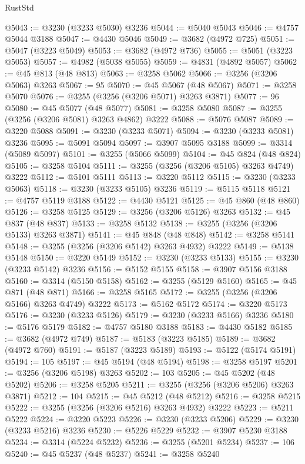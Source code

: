 \begin{lexlean}{RustStd}
\begin{coremodule}
{\begin{coremodule}
{{{{{{{{{{{{{{{{{{{{{{{{{{{{{{{{{{{{{@5043 := @3230 (@3233 @5030) @3236
@5044 := @5040 @5043
@5046 := @4757 @5044 @3188
@5047 := @4430 @5046
@5049 := @3682 (@4972 @725)
@5051 := @5047 (@3223 @5049)
@5053 := @3682 (@4972 @736)
@5055 := @5051 (@3223 @5053)
@5057 := @4982 (@5038 @5055)
@5059 := @4831 (@4892 @5057)
@5062 := @45 @813 (@48 @813)
@5063 := @3258 @5062
@5066 := @3256 (@3206 @5063) @3263
@5067 := 95
@5070 := @45 @5067 (@48 @5067)
@5071 := @3258 @5070
@5076 := @3255 (@3256 (@3206 @5071) @3263 @3871)
@5077 := 96
@5080 := @45 @5077 (@48 @5077)
@5081 := @3258 @5080
@5087 := @3255 (@3256 (@3206 @5081) @3263 @4862) @3222
@5088 := @5076 @5087
@5089 := @3220 @5088
@5091 := @3230 (@3233 @5071)
@5094 := @3230 (@3233 @5081) @3236
@5095 := @5091 @5094
@5097 := @3907 @5095 @3188
@5099 := @3314 (@5089 @5097)
@5101 := @3255 (@5066 @5099)
@5104 := @45 @824 (@48 @824)
@5105 := @3258 @5104
@5111 := @3255 (@3256 (@3206 @5105) @3263 @4749) @3222
@5112 := @5101 @5111
@5113 := @3220 @5112
@5115 := @3230 (@3233 @5063)
@5118 := @3230 (@3233 @5105) @3236
@5119 := @5115 @5118
@5121 := @4757 @5119 @3188
@5122 := @4430 @5121
@5125 := @45 @860 (@48 @860)
@5126 := @3258 @5125
@5129 := @3256 (@3206 @5126) @3263
@5132 := @45 @837 (@48 @837)
@5133 := @3258 @5132
@5138 := @3255 (@3256 (@3206 @5133) @3263 @3871)
@5141 := @45 @848 (@48 @848)
@5142 := @3258 @5141
@5148 := @3255 (@3256 (@3206 @5142) @3263 @4932) @3222
@5149 := @5138 @5148
@5150 := @3220 @5149
@5152 := @3230 (@3233 @5133)
@5155 := @3230 (@3233 @5142) @3236
@5156 := @5152 @5155
@5158 := @3907 @5156 @3188
@5160 := @3314 (@5150 @5158)
@5162 := @3255 (@5129 @5160)
@5165 := @45 @871 (@48 @871)
@5166 := @3258 @5165
@5172 := @3255 (@3256 (@3206 @5166) @3263 @4749) @3222
@5173 := @5162 @5172
@5174 := @3220 @5173
@5176 := @3230 (@3233 @5126)
@5179 := @3230 (@3233 @5166) @3236
@5180 := @5176 @5179
@5182 := @4757 @5180 @3188
@5183 := @4430 @5182
@5185 := @3682 (@4972 @749)
@5187 := @5183 (@3223 @5185)
@5189 := @3682 (@4972 @760)
@5191 := @5187 (@3223 @5189)
@5193 := @5122 (@5174 @5191)
@5194 := 105
@5197 := @45 @5194 (@48 @5194)
@5198 := @3258 @5197
@5201 := @3256 (@3206 @5198) @3263
@5202 := 103
@5205 := @45 @5202 (@48 @5202)
@5206 := @3258 @5205
@5211 := @3255 (@3256 (@3206 @5206) @3263 @3871)
@5212 := 104
@5215 := @45 @5212 (@48 @5212)
@5216 := @3258 @5215
@5222 := @3255 (@3256 (@3206 @5216) @3263 @4932) @3222
@5223 := @5211 @5222
@5224 := @3220 @5223
@5226 := @3230 (@3233 @5206)
@5229 := @3230 (@3233 @5216) @3236
@5230 := @5226 @5229
@5232 := @3907 @5230 @3188
@5234 := @3314 (@5224 @5232)
@5236 := @3255 (@5201 @5234)
@5237 := 106
@5240 := @45 @5237 (@48 @5237)
@5241 := @3258 @5240
}}}}}}}}}}}}}}}}}}}}}}}}}}}}}}}}}}}}}
\end{coremodule}}
\end{coremodule}
\end{lexlean}

